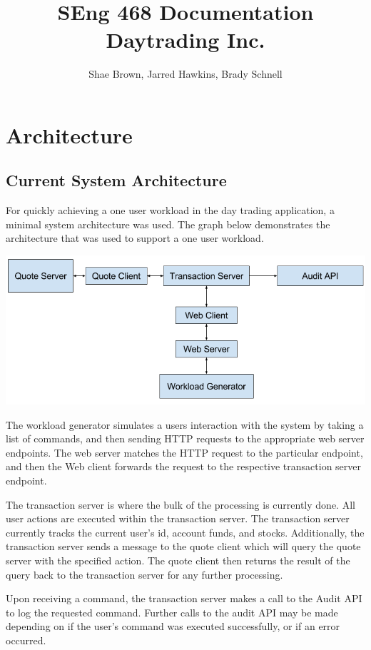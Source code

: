 \documentclass[a4paper,10pt]{article}
\title{SEng 468 Documentation\\Daytrading Inc.}
\author{Shae Brown, Jarred Hawkins, Brady Schnell}
\begin{document}
\maketitle

\tableofcontents

\section{Architecture}
\subsection{Current System Architecture}
For quickly achieving a one user workload in the day trading application, a 
minimal system architecture was used. The graph below demonstrates the 
architecture that was used to support a one user workload.

\includegraphics[width=0.9 \linewidth]{./arch.png}

The workload generator simulates a users interaction with the system by taking a 
list of commands, and then sending HTTP requests to the appropriate web server 
endpoints. The web server matches the HTTP request to the particular endpoint, 
and then the Web client forwards the request to the respective transaction 
server endpoint.

The transaction server is where the bulk of the processing is currently done. 
All user actions are executed within the transaction server. The transaction 
server currently tracks the current user's id, account funds, and stocks. 
Additionally, the transaction server sends a message to the quote client which 
will query the quote server with the specified action. The quote client then 
returns the result of the query back to the transaction server for any further 
processing.

Upon receiving a command, the transaction server makes a call to the Audit API 
to log the requested command. Further calls to the audit API may be made 
depending on if the user's command was executed successfully, or if an error 
occurred.
\end{document}
